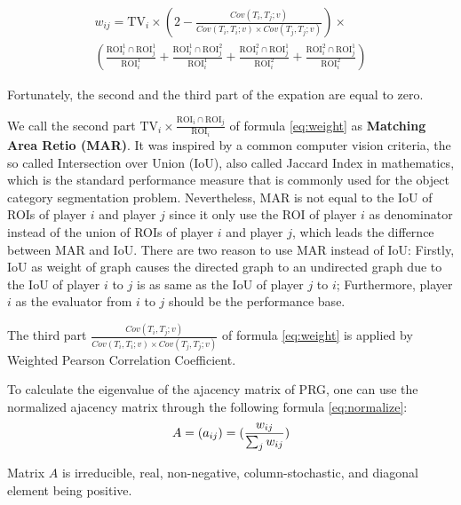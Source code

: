   \begin{multline}
  \label{eq:expand}
  w_{ij} = \text{TV}_i \times \left(2-\frac{Cov(T_i, T_j; v)}{Cov(T_i, T_i; v)\times Cov(T_j, T_j; v)}\right) \times \\
    \left( \frac{\text{ROI}_i^1\cap\text{ROI}_j^1}{\text{ROI}_i^1}           
    + \frac{\text{ROI}_i^1\cap\text{ROI}_j^2}{\text{ROI}_i^1}           
    + \frac{\text{ROI}_i^2\cap\text{ROI}_j^1}{\text{ROI}_i^2}           
    + \frac{\text{ROI}_i^2\cap\text{ROI}_j^1}{\text{ROI}_i^2} \right)
  \end{multline}

  Fortunately, the second and the third part of the expation are equal to zero.

  We call the second part $\text{TV}_i \times \frac{\text{ROI}_i\cap\text{ROI}_j}{\text{ROI}_i}$ 
  of formula \ref{eq:weight} as \textbf{Matching Area Retio (MAR)}. 
  It was inspired by a common computer vision criteria,
  the so called Intersection over Union (IoU), also called Jaccard Index in mathematics\cite{real1996probabilistic},
  which is the standard performance measure that is commonly used for the object category segmentation problem.
  Nevertheless, MAR is not equal to the IoU of ROIs of player $i$  and player $j$ since
  it only use the ROI of player $i$ as denominator instead of the union of ROIs of player $i$ and player $j$,
  which leads the differnce between MAR and IoU. There are two reason to use MAR instead of IoU:
  Firstly, IoU as weight of graph causes the directed graph to an undirected graph due to the IoU of player $i$ to $j$
  is as same as the IoU of player $j$ to $i$; Furthermore, player $i$ as the evaluator from $i$ to $j$ 
  should be the performance base.

  The third part $\frac{Cov(T_i, T_j; v)}{Cov(T_i, T_i; v)\times Cov(T_j, T_j; v)}$
  of formula \ref{eq:weight} is applied by Weighted Pearson Correlation Coefficient.
  
  To calculate the eigenvalue of the ajacency matrix of PRG, one can use the normalized ajacency matrix 
  through the following formula \ref{eq:normalize}:
  \begin{equation}
  \label{eq:normalize}
  A = (a_{ij}) = (\frac{w_{ij}}{\sum_{j}{w_{ij}}})\\
  \end{equation}

  \begin{theorem}
  Matrix $A$ is irreducible, real, non-negative, column-stochastic, and diagonal element being positive.
  \end{theorem}

